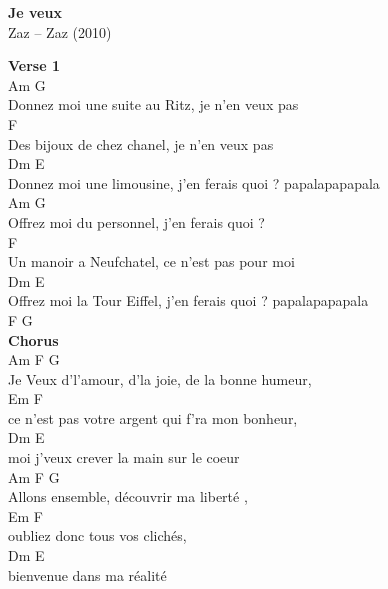 \documentclass[a4paper]{article}
\begin{document}
    \begin{center}
        \textbf{Je veux}
        ~\\
        Zaz -- Zaz (2010)
    \end{center}
    {
        \scriptsize
        \textbf{Verse 1}
        ~\\
        {
            \cutive
            \obeyspaces
Am                                         G
\\
Donnez moi une suite au Ritz, je n'en veux pas
\\
                                         F
\\
Des bijoux de chez chanel, je n'en veux pas
\\
                                      Dm           E
\\
Donnez moi une limousine, j'en ferais quoi ? papalapapapala
\\
Am                                   G
\\
Offrez moi du personnel, j'en ferais quoi ?
\\
                                         F
\\
Un manoir a Neufchatel, ce n'est pas pour moi
\\
                                       Dm           E
\\
Offrez moi la Tour Eiffel, j'en ferais quoi ? papalapapapala
\\
F  G
\\

        }
        \textbf{Chorus}
        ~\\
        {
            \cutive
            \obeyspaces
Am                    F                  G
\\
Je Veux d'l'amour, d'la joie, de la bonne humeur,
\\
                      Em                  F
\\
ce n'est pas votre argent qui f'ra mon bonheur,
\\
             Dm                    E
\\
moi j'veux crever la main sur le coeur
\\
Am                    F                  G
\\
Allons ensemble, découvrir ma liberté ,
\\
           Em           F
\\
oubliez donc tous vos clichés,
\\
       Dm                 E
\\
bienvenue dans ma réalité
\\

}}
\end{document}
